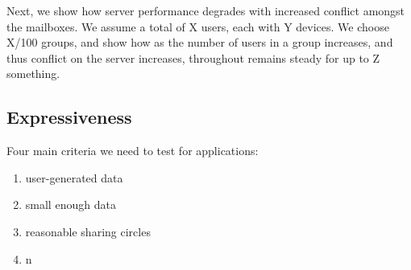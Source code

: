 Next, we show how server performance degrades with increased conflict amongst the mailboxes. We assume a total of X users, each with Y devices. We choose X/100 groups, and show how as the number of users in a group increases, and thus conflict on the server increases, throughout remains steady for up to Z something.

\subsection{Expressiveness}
Four main criteria we need to test for applications:
\begin{enumerate}
    \item user-generated data
    \item small enough data
    \item reasonable sharing circles
    \item n
\end{enumerate}




